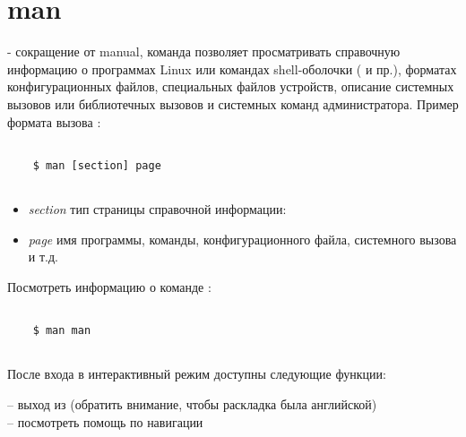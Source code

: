 \section{man}

 - сокращение от manual, команда позволяет просматривать справочную информацию о программах Linux или командах shell-оболочки ( и пр.), форматах конфигурационных файлов, специальных файлов устройств, описание системных вызовов или библиотечных вызовов и системных команд администратора. Пример формата вызова :

\begin{lstlisting}
	
	$ man [section] page
	
\end{lstlisting}	

\begin{itemize}	
	\item \textit{section} тип страницы справочной информации:
	
	\subitem {}
	\subitem {}
	\subitem {}
	\subitem {}
	\subitem {}
	\subitem {}
	\subitem {}
	\subitem {}

	\item \textit{page} имя программы, команды, конфигурационного файла, системного вызова и т.д.
\end{itemize}

Посмотреть информацию о команде :
\begin{lstlisting}
	
	$ man man
	
\end{lstlisting}

После входа в интерактивный режим  доступны следующие функции:

\noindent{} -- выход из  (обратить внимание, чтобы раскладка была английской) \\
 -- посмотреть помощь по навигации  \\


